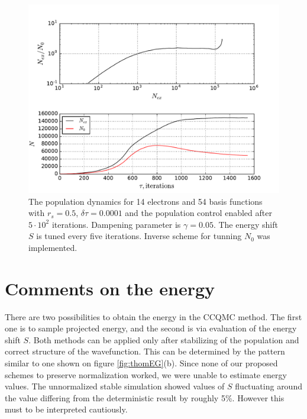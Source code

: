 \documentclass[twoside,english]{uiofysmaster}
\begin{document}
\begin{figure}[ht!]
	\centering
	\includegraphics[width=0.8\linewidth]{N0tunning}
	\caption{The population dynamics for 14 electrons and 54 basis functions with $r_s=0.5$, $\delta \tau=0.0001$ and the population control enabled after $5\cdot 10^2$ iterations. Dampening parameter is $\gamma = 0.05$. The energy shift $S$ is tuned every five iterations. Inverse scheme for tunning $N_0$ was implemented.}
	\label{fig:N0tunning}
\end{figure}

\section{Comments on the energy}
There are two possibilities to obtain the energy in the CCQMC method. The first one is to sample projected energy, and the second is via evaluation of the energy shift $S$. Both methods can be applied only after stabilizing of the population and correct structure of the wavefunction. This can be determined by the pattern similar to one shown on figure \ref{fig:thomEG}(b). Since none of our proposed schemes to preserve normalization worked, we were unable to estimate energy values. The unnormalized stable simulation showed values of $S$ fluctuating around the value differing from the deterministic result by roughly 5\%. However this must to be interpreted cautiously.    
\end{document}
